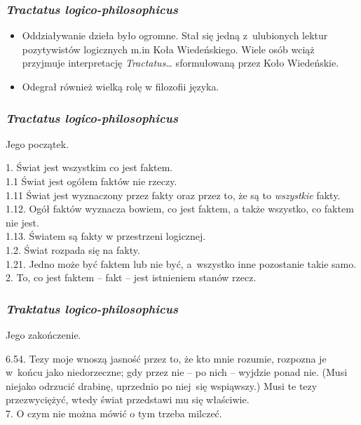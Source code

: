 \documentclass[10pt,t]{beamer}
\begin{document}
\begin{frame}
  \frametitle{\textit{Tractatus logico-philosophicus}}


  \begin{itemize}

  \item Oddziaływanie dzieła było ogromne. Stał się jedną z~ulubionych
    lektur pozytywistów logicznych m.in Koła Wiedeńskiego. Wiele osób
    wciąż przyjmuje interpretację \textit{Tractatus\ldots} sformułowaną przez
    Koło Wiedeńskie.

  \item Odegrał również wielką rolę w filozofii języka.

  \end{itemize}

\end{frame}





\begin{frame}
  \frametitle{\textit{Tractatus logico-philosophicus}}


  Jego początek.

  1. Świat jest wszystkim co jest faktem. \\
  1.1 Świat jest ogółem faktów nie rzeczy. \\
  1.11 Świat jest wyznaczony przez fakty oraz przez to, że są to
  \textit{wszystkie} fakty. \\
  1.12. Ogół faktów wyznacza bowiem, co jest faktem, a także wszystko, co
  faktem nie jest. \\
  1.13. Światem są fakty w przestrzeni logicznej. \\
  1.2. Świat rozpada się na fakty. \\
  1.21. Jedno może być faktem lub nie być, a~wszystko inne pozostanie
  takie samo. \\
  2. To, co jest faktem -- fakt -- jest istnieniem stanów rzecz.

\end{frame}





\begin{frame}
  \frametitle{\textit{Traktatus logico-philosophicus}}

  Jego zakończenie.

  6.54. Tezy moje wnoszą jasność przez to, że kto mnie rozumie, rozpozna je
  w~końcu jako niedorzeczne; gdy przez nie -- po nich -- wyjdzie ponad nie.
  (Musi niejako odrzucić drabinę, uprzednio po niej~się wspiąwszy.) Musi
  te tezy przezwyciężyć, wtedy świat przedstawi mu się właściwie. \\
  7. O czym nie można mówić o tym trzeba milczeć.

\end{frame}
\end{document}
